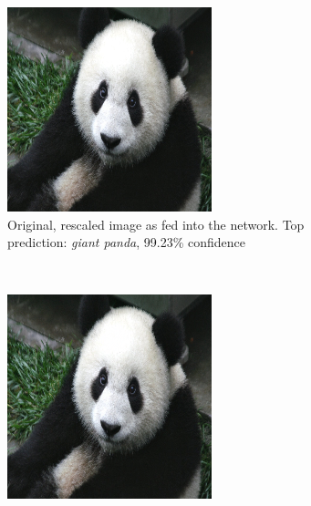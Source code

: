 \documentclass[11pt, a4paper]{article}
\begin{document}
\begin{figure}[h!tb]
    \centering
    \begin{subfigure}[b]{0.45\textwidth}
        \includegraphics[width=\textwidth]{aes_new/panda.png}
        \caption{Original, rescaled image as fed into the network. Top prediction: \emph{giant panda}, 99.23\% confidence}
        \label{fig:ae-example-original}
    \end{subfigure}
    ~ %
    \begin{subfigure}[b]{0.45\textwidth}
        \includegraphics[width=\textwidth]{aes_new/panda_acorn_10_0dot9.png}

\end{subfigure}
\end{figure}
\end{document}
